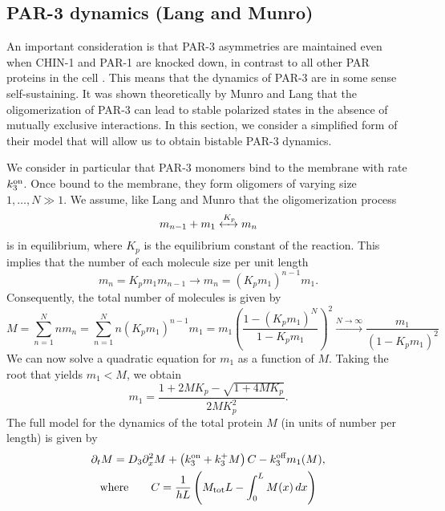 \documentclass[11pt]{article}
\newcommand{\6}[1]{#1_{\text{6}}}
\newcommand{\3}[1]{#1_{\text{3}}}
\begin{document}
\subsection{PAR-3 dynamics (Lang and Munro) \label{sec:PAR3dyn}}
An important consideration is that PAR-3 asymmetries are maintained even when CHIN-1 and PAR-1 are knocked down, in contrast to all other PAR proteins in the cell \cite{sailer2015dynamic, lang2017proteins}. This means that the dynamics of PAR-3 are in some sense self-sustaining. It was shown theoretically by Munro and Lang \cite{lang2022oligomerization} that the oligomerization of PAR-3 can lead to stable polarized states in the absence of mutually exclusive interactions. In this section, we consider a simplified form of their model that will allow us to obtain bistable PAR-3 dynamics. 

We consider in particular that PAR-3 monomers bind to the membrane with rate $\3{\kon}$. Once bound to the membrane, they form oligomers of varying size $1, \dots, N \gg 1$. We assume, like Lang and Munro \cite{lang2022oligomerization} that the oligomerization process
\begin{equation}
m_{n-1}+m_1 \xleftrightarrow[]{K_p} m_n
\end{equation}
is in equilibrium, where $K_p$ is the equilibrium constant of the reaction. This implies that the number of each molecule size per unit length 
\begin{equation}
m_n = K_p m_1 m_{n-1} \rightarrow m_n = \left(K_p m_1\right)^{n-1} m_1. 
\end{equation}
Consequently, the total number of molecules is given by 
\begin{equation}
M = \sum_{n=1}^N n m_n =\sum_{n=1}^N n \left(K_p m_1\right)^{n-1} m_1 = m_1 \left(\frac{1-\left(K_p m_1\right)^N}{1-K_p m_1}\right)^2 \xrightarrow[]{N \rightarrow \infty} \frac{m_1}{\left(1-K_p m_1\right)^2}
\end{equation}
We can now solve a quadratic equation for $m_1$ as a function of $M$. Taking the root that yields $m_1 < M$, we obtain 
\begin{equation}
\label{eq:m1first}
m_1 = \frac{1+2M K_p - \sqrt{1+4 M K_p}}{2 M K_p^2}.
\end{equation}
The full model for the dynamics of the total protein $M$ (in units of number per length) is given by 
\begin{gather}
\label{eq:DxM}
\Dt{M} = \3{D} \Dx^2{M} + \left(\3{\kon} + \3{\kf} M \right)C - \3{\koff}m_1(M),\\ 
\text{where} \qquad C = \frac{1}{h L} \left(M_\text{tot} L - \int_0^L M(x) \, dx \right)
\end{gather}
\end{document}
